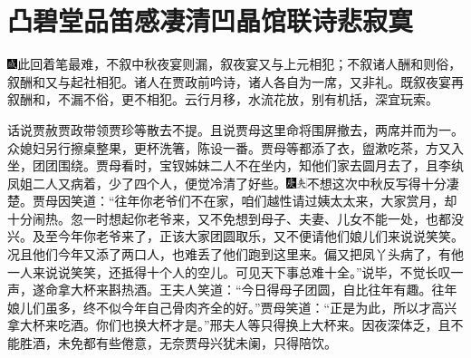 \chapter{凸碧堂品笛感凄清\hspace{.5em}凹晶馆联诗悲寂寞}

{\includegraphics[width=3mm]{../Images/00005}\kaishu 此回着笔最难，不叙中秋夜宴则漏，叙夜宴又与上元相犯；不叙诸人酬和则俗，叙酬和又与起社相犯。诸人在贾政前吟诗，诸人各自为一席，又非礼。既叙夜宴再叙酬和，不漏不俗，更不相犯。云行月移，水流花放，别有机括，深宜玩索。}

话说贾赦贾政带领贾珍等散去不提。且说贾母这里命将围屏撤去，两席并而为一。众媳妇另行擦桌整果，更杯洗箸，陈设一番。贾母等都添了衣，盥漱吃茶，方又入坐，团团围绕。贾母看时，宝钗姊妹二人不在坐内，知他们家去圆月去了，且李纨凤姐二人又病着，少了四个人，便觉冷清了好些。{\includegraphics[width=3mm]{../Images/00004}\includegraphics[width=3mm]{../Images/00012}\footnotesize \kaishu 不想这次中秋反写得十分凄楚。}贾母因笑道：``往年你老爷们不在家，咱们越性请过姨太太来，大家赏月，却十分闹热。忽一时想起你老爷来，又不免想到母子、夫妻、儿女不能一处，也都没兴。及至今年你老爷来了，正该大家团圆取乐，又不便请他们娘儿们来说说笑笑。况且他们今年又添了两口人，也难丢了他们跑到这里来。偏又把凤丫头病了，有他一人来说说笑笑，还抵得十个人的空儿。可见天下事总难十全。''说毕，不觉长叹一声，遂命拿大杯来斟热酒。王夫人笑道：``今日得母子团圆，自比往年有趣。往年娘儿们虽多，终不似今年自己骨肉齐全的好。''贾母笑道：``正是为此，所以才高兴拿大杯来吃酒。你们也换大杯才是。''邢夫人等只得换上大杯来。因夜深体乏，且不能胜酒，未免都有些倦意，无奈贾母兴犹未阑，只得陪饮。

